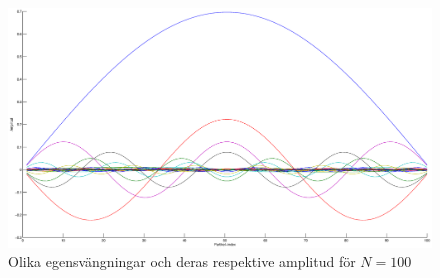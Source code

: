 \documentclass[12pt,a4paper]{article}
\newcommand{\captiona}[1]{\caption{\scriptsize{#1}}}
\begin{document}
		\begin{figure}[h]
			\includegraphics[width=1\textwidth]{vaagformer.eps}
			\vspace{-36pt}
			\captiona{Olika egensvängningar och deras respektive amplitud för $N=100$}
			\label{waves}
		\end{figure}
	
	\clearpage
	
\end{document}
